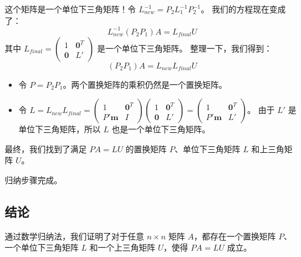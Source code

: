 \documentclass{amsart}
\theoremstyle{plain}
\theoremstyle{definition}
\theoremstyle{remark}
\begin{document}
\begin{enumerate}
\[\]
这个矩阵是一个单位下三角矩阵！令 $L_{new}^{-1} = P_2 L_1^{-1} P_2^{-1}$。
我们的方程现在变成了：
\[
L_{new}^{-1} (P_2 P_1) A = L_{final} U
\]
其中 $L_{final} = \begin{pmatrix} 1 & \mathbf{0}^T \\ \mathbf{0} & L' \end{pmatrix}$ 是一个单位下三角矩阵。
整理一下，我们得到：
\[
(P_2 P_1) A = L_{new} L_{final} U
\]
	\begin{itemize}
		\item 令 $P = P_2 P_1$。两个置换矩阵的乘积仍然是一个置换矩阵。
		\item 令 $L = L_{new} L_{final} = \begin{pmatrix} 1 & \mathbf{0}^T \\ P'\mathbf{m} & I \end{pmatrix} \begin{pmatrix} 1 & \mathbf{0}^T \\ \mathbf{0} & L' \end{pmatrix} = \begin{pmatrix} 1 & \mathbf{0}^T \\ P'\mathbf{m} & L' \end{pmatrix}$。
由于 $L'$ 是单位下三角矩阵，所以 $L$ 也是一个单位下三角矩阵。
	\end{itemize}
\end{enumerate}

最终，我们找到了满足 $PA = LU$ 的置换矩阵 $P$、单位下三角矩阵 $L$ 和上三角矩阵 $U$。

归纳步骤完成。

\subsection{结论}

通过数学归纳法，我们证明了对于任意 $n \times n$ 矩阵 $A$，都存在一个置换矩阵 $P$、一个单位下三角矩阵 $L$ 和一个上三角矩阵 $U$，使得 $PA = LU$ 成立。
\end{document}
